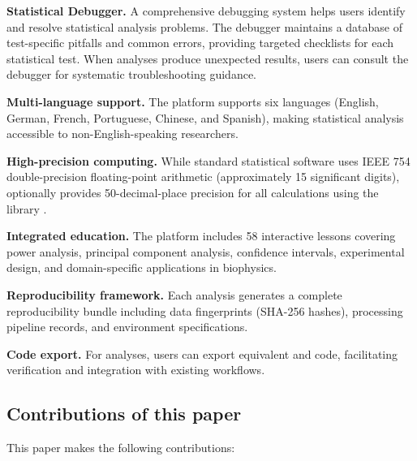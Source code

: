 \documentclass[article]{jss}
\begin{document}
\textbf{Statistical Debugger.} A comprehensive debugging system helps users identify and resolve statistical analysis problems. The debugger maintains a database of test-specific pitfalls and common errors, providing targeted checklists for each statistical test. When analyses produce unexpected results, users can consult the debugger for systematic troubleshooting guidance.

\textbf{Multi-language support.} The platform supports six languages (English, German, French, Portuguese, Chinese, and Spanish), making statistical analysis accessible to non-English-speaking researchers.

\textbf{High-precision computing.} While standard statistical software uses IEEE 754 double-precision floating-point arithmetic (approximately 15 significant digits),  optionally provides 50-decimal-place precision for all calculations using the  library \citep{johansson2013mpmath}.

\textbf{Integrated education.} The platform includes 58 interactive lessons covering power analysis, principal component analysis, confidence intervals, experimental design, and domain-specific applications in biophysics.

\textbf{Reproducibility framework.} Each analysis generates a complete reproducibility bundle including data fingerprints (SHA-256 hashes), processing pipeline records, and environment specifications.

\textbf{Code export.} For analyses, users can export equivalent  and  code, facilitating verification and integration with existing workflows.

\subsection{Contributions of this paper}

This paper makes the following contributions:
\end{document}
